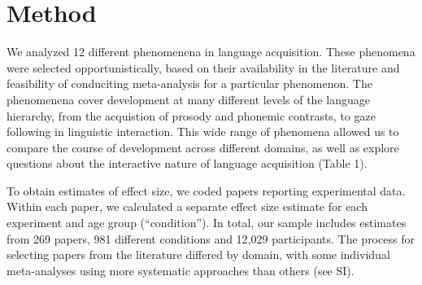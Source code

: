 \documentclass[english,floatsintext,man]{apa6}
\begin{document}
\section{Method}\label{method}

We analyzed 12 different phenomenena in language acquisition. These
phenomena were selected opportunistically, based on their availability
in the literature and feasibility of conduciting meta-analysis for a
particular phenomenon. The phenomenena cover development at many
different levels of the language hierarchy, from the acquistion of
prosody and phonemic contrasts, to gaze following in linguistic
interaction. This wide range of phenomena allowed us to compare the
course of development across different domains, as well as explore
questions about the interactive nature of language acquisition (Table
1).

To obtain estimates of effect size, we coded papers reporting
experimental data. Within each paper, we calculated a separate effect
size estimate for each experiment and age group (\enquote{condition}).
In total, our sample includes estimates from 269 papers, 981 different
conditions and 12,029 participants. The process for selecting papers
from the literature differed by domain, with some individual
meta-analyses using more systematic approaches than others (see SI).
\renewcommand{\arraystretch}{1.5}
\end{document}
